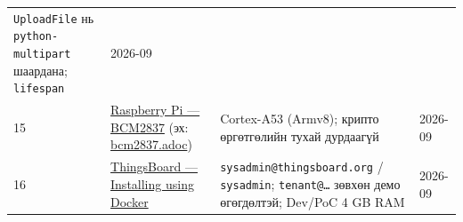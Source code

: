 \begin{longtable}[]{@{}llll@{}}
\begin{minipage}[t]{0.22\columnwidth}
\texttt{UploadFile} нь \texttt{python-multipart} шаардана; \texttt{lifespan}\strut
\end{minipage} & \begin{minipage}[t]{0.22\columnwidth}\raggedright
2026-09\strut
\end{minipage}\tabularnewline
\begin{minipage}[t]{0.22\columnwidth}\raggedright
15\strut
\end{minipage} & \begin{minipage}[t]{0.22\columnwidth}\raggedright
\href{https://www.raspberrypi.com/documentation/computers/processors.html\#bcm2837}{Raspberry Pi --- BCM2837} (эх: \href{https://github.com/raspberrypi/documentation/blob/master/documentation/asciidoc/computers/processors/bcm2837.adoc}{bcm2837.adoc})\strut
\end{minipage} & \begin{minipage}[t]{0.22\columnwidth}\raggedright
Cortex-A53 (Armv8); крипто өргөтгөлийн тухай дурдаагүй\strut
\end{minipage} & \begin{minipage}[t]{0.22\columnwidth}\raggedright
2026-09\strut
\end{minipage}\tabularnewline
\begin{minipage}[t]{0.22\columnwidth}\raggedright
16\strut
\end{minipage} & \begin{minipage}[t]{0.22\columnwidth}\raggedright
\href{https://thingsboard.io/docs/installation/docker/}{ThingsBoard --- Installing using Docker}\strut
\end{minipage} & \begin{minipage}[t]{0.22\columnwidth}\raggedright
\texttt{sysadmin@thingsboard.\allowbreak{}org} / \texttt{sysadmin}; \texttt{tenant@\ldots{}} зөвхөн демо өгөгдөлтэй; Dev/PoC 4 GB RAM\strut
\end{minipage} & \begin{minipage}[t]{0.22\columnwidth}\raggedright
2026-09\strut
\end{minipage}\tabularnewline
\bottomrule
\end{longtable}\endgroup
